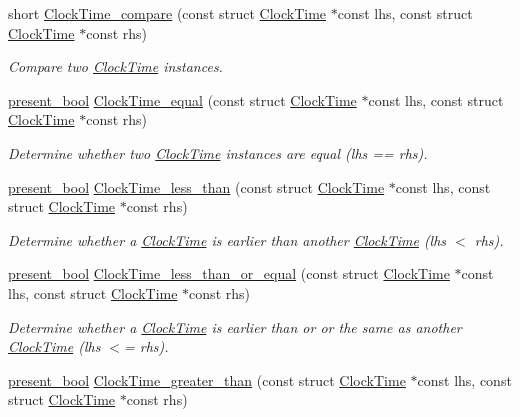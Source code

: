 \begin{DoxyCompactItemize}
short \hyperlink{clock-time_8h_ad37e5e53161a2f6113202b30779d5439}{Clock\-Time\-\_\-compare} (const struct \hyperlink{structClockTime}{Clock\-Time} $\ast$const lhs, const struct \hyperlink{structClockTime}{Clock\-Time} $\ast$const rhs)
\begin{DoxyCompactList}\small\item\em Compare two \hyperlink{structClockTime}{Clock\-Time} instances. \end{DoxyCompactList}\item 
\hyperlink{types_8h_a1c24e2cdd988b886e889080ded176ae0}{present\-\_\-bool} \hyperlink{clock-time_8h_aface5d0e8bf75acddb72475d76c4b1d8}{Clock\-Time\-\_\-equal} (const struct \hyperlink{structClockTime}{Clock\-Time} $\ast$const lhs, const struct \hyperlink{structClockTime}{Clock\-Time} $\ast$const rhs)
\begin{DoxyCompactList}\small\item\em Determine whether two \hyperlink{structClockTime}{Clock\-Time} instances are equal (lhs == rhs). \end{DoxyCompactList}\item 
\hyperlink{types_8h_a1c24e2cdd988b886e889080ded176ae0}{present\-\_\-bool} \hyperlink{clock-time_8h_ad0b394066f11e1f695bd10c2aad04ea0}{Clock\-Time\-\_\-less\-\_\-than} (const struct \hyperlink{structClockTime}{Clock\-Time} $\ast$const lhs, const struct \hyperlink{structClockTime}{Clock\-Time} $\ast$const rhs)
\begin{DoxyCompactList}\small\item\em Determine whether a \hyperlink{structClockTime}{Clock\-Time} is earlier than another \hyperlink{structClockTime}{Clock\-Time} (lhs $<$ rhs). \end{DoxyCompactList}\item 
\hyperlink{types_8h_a1c24e2cdd988b886e889080ded176ae0}{present\-\_\-bool} \hyperlink{clock-time_8h_a8725113f40fe7aae309480cc0b666c16}{Clock\-Time\-\_\-less\-\_\-than\-\_\-or\-\_\-equal} (const struct \hyperlink{structClockTime}{Clock\-Time} $\ast$const lhs, const struct \hyperlink{structClockTime}{Clock\-Time} $\ast$const rhs)
\begin{DoxyCompactList}\small\item\em Determine whether a \hyperlink{structClockTime}{Clock\-Time} is earlier than or or the same as another \hyperlink{structClockTime}{Clock\-Time} (lhs $<$= rhs). \end{DoxyCompactList}\item 
\hyperlink{types_8h_a1c24e2cdd988b886e889080ded176ae0}{present\-\_\-bool} \hyperlink{clock-time_8h_ae2c5d81af2ab38abf4248271cb45be33}{Clock\-Time\-\_\-greater\-\_\-than} (const struct \hyperlink{structClockTime}{Clock\-Time} $\ast$const lhs, const struct \hyperlink{structClockTime}{Clock\-Time} $\ast$const rhs)

\end{DoxyCompactItemize}
